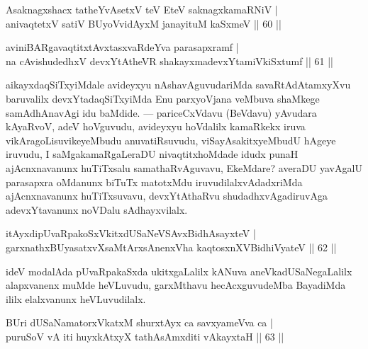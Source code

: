 \begin{shl}
Asaknagxshacx tatheYvA\s \s setxV \footnotemark{}teV EteV saknagxkamaRNiV |\\
anivaqtetxV satiV BUyoV\s vidAyxM janayituM kaSxmeV \hfill || 60 ||
\end{shl}

\begin{shl}
aviniBARgavaqtitxtAvxtasxvaRdeYva parasapxramf |\\
\footnotemark{}na cAvishudedhxV devxYtAtheVR shakayxmadevxYtamiVkiSxtumf \hfill || 61 ||
\end{shl}

\begin{artha}
aikayxdaqSiTxyiMdale avideyxyu nAshavAguvudariMda savaRtAdAtamxyXvu baruvalilx devxYtadaqSiTxyiMda Enu parxyoVjana veMbuva shaMkege samAdhAnavAgi idu baMdide. --- pariceCxVdavu (BeVdavu) yAvudara kAyaRvoV, adeV hoVguvudu, avideyxyu hoVdalilx kamaRkekx iruva vikAragoLisuvikeyeMbudu anuvatiRsuvudu, viSayAsakitxyeMbudU hAgeye iruvudu, I saMgakamaRgaLeraDU nivaqtitxhoMdade idudx punaH ajAcnxnavanunx huTiTxsalu samathaRvAguvavu, EkeMdare? averaDU yavAgalU parasapxra oMdanunx biTuTx matotxMdu iruvudilalxvAdadxriMda ajAcnxnavanunx huTiTxsuvavu, devxYtAthaRvu shudadhxvAgadiruvAga adevxYtavanunx noVDalu sAdhayxvilalx.
\end{artha}

\begin{shl}
itAyxdipUvaRpakoSxVkitxdUSaNeVSAvxBidhAsayxteV |\\
garxnathxBUyasatxvXsaMtArxsAnenxVha kaqtosxnXV\s BidhiVyateV \hfill || 62 ||
\end{shl}

\begin{artha}
ideV modalAda pUvaRpakaSxda ukitxgaLalilx kANuva aneVkadUSaNegaLalilx alapxvanenx muMde heVLuvudu, garxMthavu hecAcxguvudeMba BayadiMda ililx elalxvanunx heVLuvudilalx.
\end{artha}


\begin{shl}
BUri dUSaNamatorxVkatxM shurxtAyx ca savxyameVva ca |\\
puruSoV vA iti huyxkAtxyX tathA\s sAmxditi vAkayxtaH \hfill || 63 ||
\end{shl}

